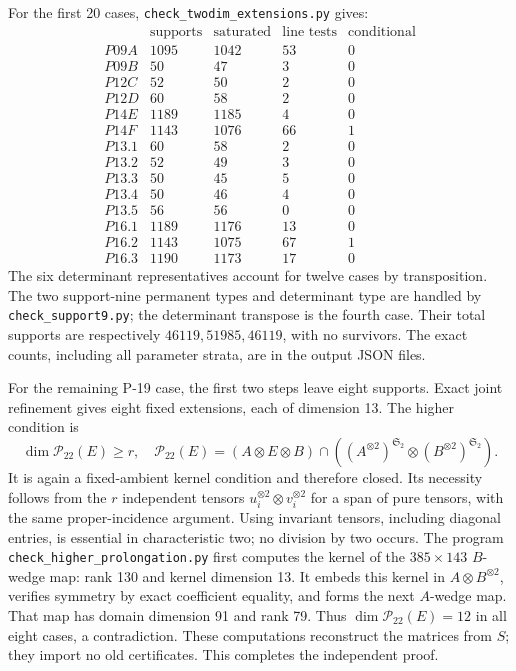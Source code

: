 For the first 20 cases, \texttt{check\_twodim\_extensions.py} gives:
\[
\begin{array}{c|r|r|r|r}
&\text{supports}&\text{saturated}&\text{line tests}&\text{conditional}\\\hline
 P09A&1095&1042&53&0\\
 P09B&50&47&3&0\\
 P12C&52&50&2&0\\
 P12D&60&58&2&0\\
 P14E&1189&1185&4&0\\
 P14F&1143&1076&66&1\\
 P13.1&60&58&2&0\\
 P13.2&52&49&3&0\\
 P13.3&50&45&5&0\\
 P13.4&50&46&4&0\\
 P13.5&56&56&0&0\\
 P16.1&1189&1176&13&0\\
 P16.2&1143&1075&67&1\\
 P16.3&1190&1173&17&0
\end{array}
\]
The six determinant representatives account for twelve cases by transposition.
The two support-nine permanent types and determinant type are handled by
\texttt{check\_support9.py}; the determinant transpose is the fourth case.
Their total supports are respectively $46119,51985,46119$, with no survivors.
The exact counts, including all parameter strata, are in the output JSON files.

For the remaining P-19 case, the first two steps leave eight supports.
Exact joint refinement gives eight fixed extensions, each of dimension 13.
The higher condition is
\[
 \dim\mathcal P_{22}(E)\ge r,
 \quad
 \mathcal P_{22}(E)=
 (A\otimes E\otimes B)\cap
 ((A^{\otimes2})^{\mathfrak S_2}\otimes(B^{\otimes2})^{\mathfrak S_2}).
\]
It is again a fixed-ambient kernel condition and therefore closed.  Its
necessity follows from the $r$ independent tensors $u_i^{\otimes2}\otimes
v_i^{\otimes2}$ for a span of pure tensors, with the same proper-incidence
argument.  Using invariant tensors, including diagonal entries, is essential
in characteristic two; no division by two occurs.
The program \texttt{check\_higher\_prolongation.py} first computes the kernel
of the $385\times143$ $B$-wedge map: rank 130 and kernel dimension 13.
It embeds this kernel in $A\otimes B^{\otimes2}$, verifies symmetry by exact
coefficient equality, and forms the next $A$-wedge map.  That map has domain
dimension 91 and rank 79.  Thus $\dim\mathcal P_{22}(E)=12$ in all eight cases,
a contradiction.  These computations reconstruct the matrices from $S$;
they import no old certificates.  This completes the independent proof.


